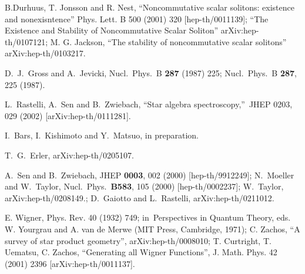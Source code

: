 \documentclass[a4paper,aps,preprint,nofootinbib,eqsecnum]{revtex4}
\begin{document}
\begin{thebibliography}{99}
 {\small B.Durhuus, T. Jonsson and R. Nest,
``Noncommutative scalar solitons: existence and nonexisntence'' Phys. Lett.
B 500 (2001) 320 [hep-th/0011139]; ``The Existence and Stability of
Noncommutative Scalar Soliton'' arXiv:hep-th/0107121;\newline
M. G. Jackson, ``The stability of noncommutative scalar solitons''
arXiv:hep-th/0103217. }

 {\small %
D.~J.~Gross and A.~Jevicki, Nucl.\ Phys.\ B \textbf{287} (1987) 225;
Nucl.\ Phys.\ B \textbf{287}, 225 (1987). %
}

 {\small L.~Rastelli, A.~Sen and B.~Zwiebach,
\textquotedblleft Star algebra spectroscopy,\textquotedblright\  JHEP 0203,
029 (2002) [arXiv:hep-th/0111281].}

 {\small I.~Bars, I.~Kishimoto and Y.~Matsuo, in preparation. }

 {\small T.~G.~Erler,
arXiv:hep-th/0205107. %
}

 {\small %
A.\ Sen and B.\ Zwiebach, %
JHEP \textbf{0003}, 002 (2000) [hep-th/9912249];\newline
%
N.\ Moeller and W.\ Taylor,
Nucl.\ Phys.\ \textbf{B583}, 105 (2000) [hep-th/0002237];\newline
W.~Taylor, %
arXiv:hep-th/0208149.;\newline
%
%
D.~Gaiotto and L.~Rastelli, %
arXiv:hep-th/0211012. %
}

 {\small E. Wigner, Phys. Rev. 40 (1932) 749; in\
 Perspectives in Quantum Theory, eds. W. Yourgrau and A. van de Merwe (MIT
 Press, Cambridge, 1971); C. Zachos, \textquotedblleft A survey of star
 product geometry\textquotedblright , arXiv:hep-th/0008010; T. Curtright, T.
 Uematsu, C. Zachos, \textquotedblleft Generating all Wigner
 Functions\textquotedblright , J. Math. Phys. 42 (2001) 2396
 [arXiv:hep-th/0011137].}


\end{thebibliography}
\end{document}

